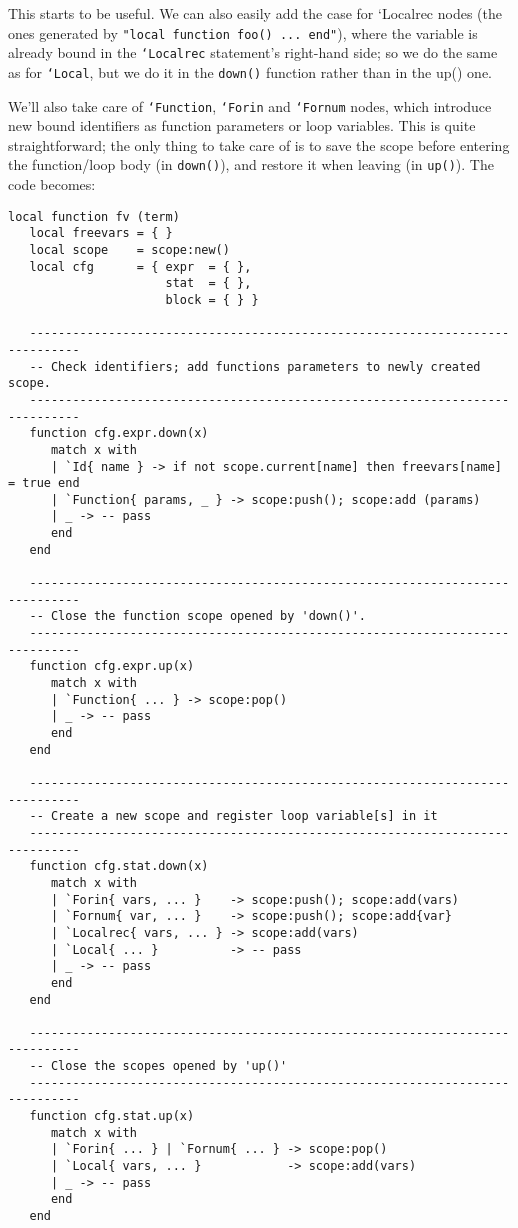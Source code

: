 This starts to be useful. We can also easily add the case for `Localrec{ } nodes
(the ones generated by {\tt "local function foo() ... end"}), where the variable
is already bound in the {\tt`Localrec} statement's right-hand side; so we do the
same as for {\tt`Local}, but we do it in the {\tt down()} function rather than
in the up() one.

We'll also take care of {\tt`Function}, {\tt`Forin} and {\tt`Fornum} nodes,
which introduce new bound identifiers as function parameters or loop variables.
This is quite straightforward; the only thing to take care of is to save the
scope before entering the function/loop body (in {\tt down()}), and restore it
when leaving (in {\tt up()}). The code becomes:

  
\begin{Verbatim}[fontsize=\scriptsize]
local function fv (term)
   local freevars = { }
   local scope    = scope:new()
   local cfg      = { expr  = { },
                      stat  = { },
                      block = { } }

   -----------------------------------------------------------------------------
   -- Check identifiers; add functions parameters to newly created scope.
   -----------------------------------------------------------------------------
   function cfg.expr.down(x)
      match x with
      | `Id{ name } -> if not scope.current[name] then freevars[name] = true end
      | `Function{ params, _ } -> scope:push(); scope:add (params)
      | _ -> -- pass
      end
   end

   -----------------------------------------------------------------------------
   -- Close the function scope opened by 'down()'.
   -----------------------------------------------------------------------------
   function cfg.expr.up(x)  
      match x with
      | `Function{ ... } -> scope:pop()
      | _ -> -- pass
      end
   end

   -----------------------------------------------------------------------------
   -- Create a new scope and register loop variable[s] in it
   -----------------------------------------------------------------------------
   function cfg.stat.down(x)
      match x with
      | `Forin{ vars, ... }    -> scope:push(); scope:add(vars)
      | `Fornum{ var, ... }    -> scope:push(); scope:add{var}
      | `Localrec{ vars, ... } -> scope:add(vars)
      | `Local{ ... }          -> -- pass
      | _ -> -- pass
      end
   end

   -----------------------------------------------------------------------------
   -- Close the scopes opened by 'up()'
   -----------------------------------------------------------------------------
   function cfg.stat.up(x)
      match x with
      | `Forin{ ... } | `Fornum{ ... } -> scope:pop()
      | `Local{ vars, ... }            -> scope:add(vars)
      | _ -> -- pass
      end
   end


\end{Verbatim}
